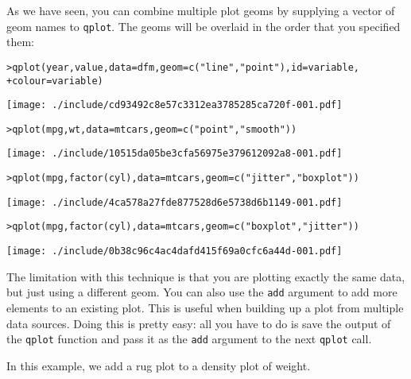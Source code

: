 As we have seen, you can combine multiple plot geoms by supplying a vector of geom names to {\tt qplot}.  The geoms will be overlaid in the order that you specified them:

\begin{alltt}
> qplot(year, value, data = dfm, geom = c("line", "point"), id = variable, 
+     colour = variable)
\end{alltt}
\texttt{[image: ./include/cd93492c8e57c3312ea3785285ca720f-001.pdf]}
\begin{alltt}

> qplot(mpg, wt, data = mtcars, geom = c("point", "smooth"))
\end{alltt}
\texttt{[image: ./include/10515da05be3cfa56975e379612092a8-001.pdf]}
\begin{alltt}

> qplot(mpg, factor(cyl), data = mtcars, geom = c("jitter", "boxplot"))
\end{alltt}
\texttt{[image: ./include/4ca578a27fde877528d6e5738d6b1149-001.pdf]}
\begin{alltt}

> qplot(mpg, factor(cyl), data = mtcars, geom = c("boxplot", "jitter"))
\end{alltt}
\texttt{[image: ./include/0b38c96c4ac4dafd415f69a0cfc6a44d-001.pdf]}
\begin{alltt}

\end{alltt}

The limitation with this technique is that you are plotting exactly the same data, but just using a different geom.  You can also use the {\tt add} argument to add more elements to an existing plot.  This is useful when building up a plot from multiple data sources. Doing this is pretty easy: all you have to do is save the output of the {\tt qplot} function and pass it as the {\tt add} argument to the next {\tt qplot} call.

In this example, we add a rug plot to a density plot of weight.

